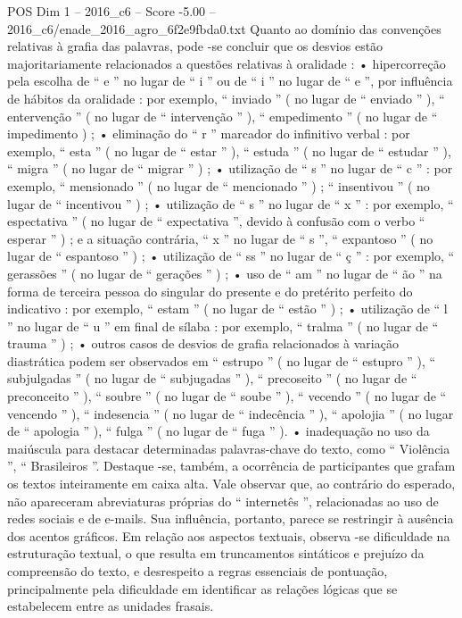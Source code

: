 \begin{textsample}{POS Dim 1 – 2016\_c6 – Score -5.00 – 2016\_c6/enade\_2016\_agro\_6f2e9fbda0.txt}
Quanto ao domínio das convenções relativas à grafia das palavras, pode -se concluir que os desvios estão majoritariamente relacionados a questões relativas à oralidade : • hipercorreção pela escolha de “ e ” no lugar de “ i ” ou de “ i ” no lugar de “ e ”, por influência de hábitos da oralidade : por exemplo, “ inviado ” ( no lugar de “ enviado ” ), “ entervenção ” ( no lugar de “ intervenção ” ), “ empedimento ” ( no lugar de “ impedimento ) ; • eliminação do “ r ” marcador do infinitivo verbal : por exemplo, “ esta ” ( no lugar de “ estar ” ), “ estuda ” ( no lugar de “ estudar ” ), “ migra ” ( no lugar de “ migrar ” ) ; • utilização de “ s ” no lugar de “ c ” : por exemplo, “ mensionado ” ( no lugar de “ mencionado ” ) ; “ insentivou ” ( no lugar de “ incentivou ” ) ; • utilização de “ s ” no lugar de “ x ” : por exemplo, “ espectativa ” ( no lugar de “ expectativa ”, devido à confusão com o verbo “ esperar ” ) ; e a situação contrária, “ x ” no lugar de “ s ”, “ expantoso ” ( no lugar de “ espantoso ” ) ; • utilização de “ ss ” no lugar de “ ç ” : por exemplo, “ gerassões ” ( no lugar de “ gerações ” ) ; • uso de “ am ” no lugar de “ ão ” na forma de terceira pessoa do singular do presente e do pretérito perfeito do indicativo : por exemplo, “ estam ” ( no lugar de “ estão ” ) ; • utilização de “ l ” no lugar de “ u ” em final de sílaba : por exemplo, “ tralma ” ( no lugar de “ trauma ” ) ; • outros casos de desvios de grafia relacionados à variação diastrática podem ser observados em “ estrupo ” ( no lugar de “ estupro ” ), “ subjulgadas ” ( no lugar de “ subjugadas ” ), “ precoseito ” ( no lugar de “ preconceito ” ), “ soubre ” ( no lugar de “ soube ” ), “ vecendo ” ( no lugar de “ vencendo ” ), “ indesencia ” ( no lugar de “ indecência ” ), “ apolojia ” ( no lugar de “ apologia ” ), “ fulga ” ( no lugar de “ fuga ” ). • inadequação no uso da maiúscula para destacar determinadas palavras-chave do texto, como “ Violência ”, “ Brasileiros ”.
Destaque -se, também, a ocorrência de participantes que grafam os textos inteiramente em caixa alta.
Vale observar que, ao contrário do esperado, não apareceram abreviaturas próprias do “ internetês ”, relacionadas ao uso de redes sociais e de e-mails.
Sua influência, portanto, parece se restringir à ausência dos acentos gráficos.
Em relação aos aspectos textuais, observa -se dificuldade na estruturação textual, o que resulta em truncamentos sintáticos e prejuízo da compreensão do texto, e desrespeito a regras essenciais de pontuação, principalmente pela dificuldade em identificar as relações lógicas que se estabelecem entre as unidades frasais.

\end{textsample}
